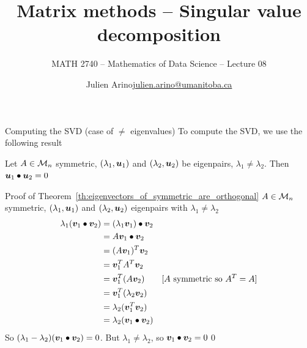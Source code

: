 \documentclass[aspectratio=169]{beamer}\usepackage[]{graphicx}\usepackage[]{xcolor}
\subtitle{MATH 2740 -- Mathematics of Data Science -- Lecture 08}
\author{\texorpdfstring{Julien Arino\newline\url{julien.arino@umanitoba.ca}}{Julien Arino}}
\institute{Department of Mathematics @ University of Manitoba}
\title{Matrix methods -- Singular value decomposition}
\begin{document}
\setcounter{theorem}{75} 





\begin{frame}{Computing the SVD (case of $\neq$ eigenvalues)}
To compute the SVD, we use the following result
\vfill
\begin{theorem}\label{th:eigenvectors_of_symmetric_are_orthogonal}
Let $A\in\mathcal{M}_n$ symmetric, $(\lambda_1,\bm{u}_1)$ and $(\lambda_2,\bm{u}_2)$ be eigenpairs, $\lambda_1\neq\lambda_2$. Then $\bm{u}_1\bullet\bm{u}_2=0$
\end{theorem}
\end{frame}

\begin{frame}[red]{Proof of Theorem~\ref{th:eigenvectors_of_symmetric_are_orthogonal}}
$A\in\mathcal{M}_n$ symmetric, $(\lambda_1,\bm{u}_1)$ and $(\lambda_2,\bm{u}_2)$ eigenpairs with $\lambda_1\neq\lambda_2$
\begin{align*}
\lambda_1(\bm{v}_1\bullet\bm{v}_2) 
&= (\lambda_1\bm{v}_1)\bullet\bm{v}_2 \\
&= A\bm{v}_1\bullet\bm{v}_2 \\
&= (A\bm{v}_1)^T\bm{v}_2 \\
&= \bm{v}_1^TA^T\bm{v}_2 \\
&= \bm{v}_1^T(A\bm{v}_2)  \qquad\textrm{[$A$ symmetric so $A^T=A$]} \\
&= \bm{v}_1^T(\lambda_2\bm{v}_2) \\
&= \lambda_2(\bm{v}_1^T\bm{v}_2) \\
&= \lambda_2(\bm{v}_1\bullet\bm{v}_2)
\end{align*}
\vfill
So $(\lambda_1-\lambda_2)(\bm{v}_1\bullet\bm{v}_2)=0$. But $\lambda_1\neq\lambda_2$, so $\bm{v}_1\bullet\bm{v}_2=0$\hfill\qed
\end{frame}
\end{document}
